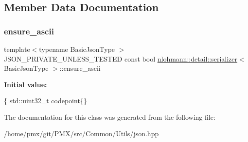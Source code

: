 \subsection{Member Data Documentation}
\mbox{\label{classnlohmann_1_1detail_1_1serializer_ab4c340f2a5230f766a833366603a0049}} 
\subsubsection{\texorpdfstring{ensure\+\_\+ascii}{ensure\_ascii}}
{\footnotesize\ttfamily template$<$typename Basic\+Json\+Type $>$ \\
J\+S\+O\+N\+\_\+\+P\+R\+I\+V\+A\+T\+E\+\_\+\+U\+N\+L\+E\+S\+S\+\_\+\+T\+E\+S\+T\+ED const bool \hyperlink{classnlohmann_1_1detail_1_1serializer}{nlohmann\+::detail\+::serializer}$<$ Basic\+Json\+Type $>$\+::ensure\+\_\+ascii}

{\bfseries Initial value\+:}
\begin{DoxyCode}
\{
        std::uint32\_t codepoint\{\}
\end{DoxyCode}


The documentation for this class was generated from the following file\+:\begin{DoxyCompactItemize}
\item 
/home/pmx/git/\+P\+M\+X/src/\+Common/\+Utils/json.\+hpp\end{DoxyCompactItemize}
